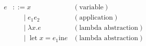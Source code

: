 \documentclass[12pt]{article}
\begin{document}
\pagestyle{empty}

\begin{align*}
  e
  &\mathrel{::=} x &(\text{variable}) \\
  &\phantom{:::}\mid e_1 e_2 &(\text{application}) \\
  &\phantom{:::}\mid \lambda x. e &(\text{lambda abstraction}) \\
  &\phantom{:::}\mid \mathop{\mathrm{let}} x = e_1 \mathrel{\mathrm{in}} e &(\text{lambda abstraction})
\end{align*}
\end{document}
